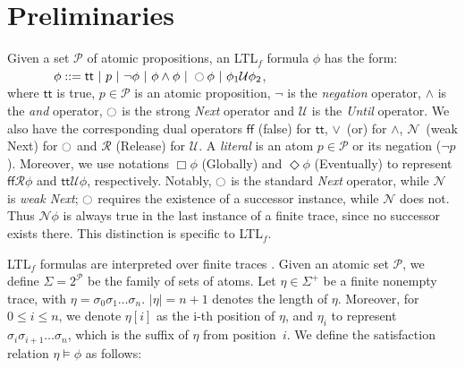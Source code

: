 \documentclass[letterpaper]{article} %
\newcommand{\N}{\mathcal{N}} \newcommand{\R}{\mathcal{R}} \newcommand{\A}{\mathcal{A}}
\newcommand{\U}{\mathcal{U}} \newcommand{\V}{\mathcal{V}} %
\newcommand{\F}{\Diamond} \newcommand{\G}{\Box}
\newcommand{\ltlf}{\textsf{LTL}$_f$\xspace}
\newcommand{\ff}{\textsf{ff}\xspace}
\newcommand{\true}{\textsf{tt}\xspace}
\begin{document}
\section{Preliminaries}\label{sec:pre}
Given a set $\mathcal{P}$ of atomic propositions, an \ltlf formula
$\phi$ has the form:
$\ \ \ \ \ \ \ \ \ \ \ \phi ::= \true\ |\ p\ |\ \neg \phi\ |\ \phi\wedge\phi\ |\ \ocircle \phi\ |\ \phi_1 \U\phi_2$,\\
%
where $\true$ is true, $p \in \mathcal{P}$ is an atomic proposition, $\neg$ is the \emph{negation} operator, $\wedge$ is the \emph{and} operator, $\ocircle$ is the strong \emph{Next} operator 
and  $\U$ is the \emph{Until} operator. We also have the corresponding dual operators $\ff$ (false) for $\true$, $\vee$~(or) for $\wedge$, 
$\N$~(weak Next) for $\ocircle$ and $\R$ (Release) for $\U$. A \emph{literal} is an atom $p\in\mathcal{P}$ or its negation ($\neg p$).
Moreover, we use notations $\G\phi$ (Globally) and $\F\phi$ (Eventually) to represent $\ff \R\phi$ and $\true \U\phi$, respectively.
Notably, $\ocircle$ is the standard \emph{Next} operator, while $\N$ is \emph{weak Next}; 
$\ocircle$ requires the existence of a successor instance, while $\N$ does not. 
Thus $\N\phi$ is always true in the last instance of a finite trace, since no successor exists there.
This distinction is specific to \ltlf.

\ltlf formulas are interpreted over finite traces \cite{GV13}.
Given an atomic set $\mathcal{P}$, we define $\Sigma = 2^{\mathcal{P}}$ be  the family of sets of atoms. Let
$\eta\in\Sigma^+$ be a finite nonempty trace, with $\eta=\sigma_0\sigma_1\ldots\sigma_n$. $|\eta|=n+1$ denotes the length of $\eta$. Moreover, for $0\leq
i\leq n$, we denote $\eta[i]$ as the i-th position of $\eta$, and 
$\eta_i$ to represent $\sigma_i\sigma_{i+1}\ldots\sigma_n$, which is
the suffix of $\eta$ from position~$i$. We define the satisfaction relation $\eta\models\phi$ as follows:
\end{document}
